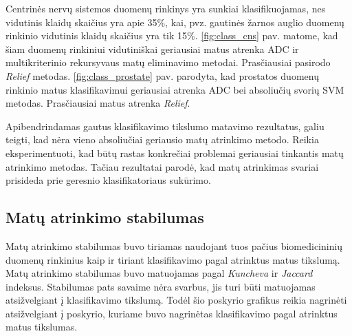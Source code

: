 Centrinės nervų sistemos duomenų rinkinys yra sunkiai klasifikuojamas, nes vidutinis klaidų skaičius yra apie 35\%, kai, pvz. gautinės žarnos auglio duomenų rinkinio vidutinis klaidų skaičius yra tik 15\%. \ref{fig:class_cns} pav. matome, kad šiam duomenų rinkiniui vidutiniškai geriausiai matus atrenka ADC ir multikriterinio rekursyvaus matų eliminavimo metodai. Prasčiausiai pasirodo \textit{Relief} metodas.
\ref{fig:class_prostate} pav. parodyta, kad prostatos duomenų rinkinio matus klasifikavimui geriausiai atrenka ADC bei absoliučių svorių SVM metodas. Prasčiausiai matus atrenka \textit{Relief}.

Apibendrindamas gautus klasifikavimo tikslumo matavimo rezultatus, galiu teigti, kad nėra vieno absoliučiai geriausio matų atrinkimo metodo. Reikia eksperimentuoti, kad būtų rastas konkrečiai problemai geriausiai tinkantis matų atrinkimo metodas. Tačiau rezultatai parodė, kad matų atrinkimas svariai prisideda prie geresnio klasifikatoriaus sukūrimo.

\subsection{Matų atrinkimo stabilumas}

Matų atrinkimo stabilumas buvo tiriamas naudojant tuos pačius biomedicininių duomenų rinkinius kaip ir tiriant klasifikavimo pagal atrinktus matus tikslumą. Matų atrinkimo stabilumas buvo matuojamas pagal \textit{Kuncheva} ir \textit{Jaccard} indeksus. Stabilumas pats savaime nėra svarbus, jis turi būti matuojamas atsižvelgiant į klasifikavimo tikslumą. Todėl šio poskyrio grafikus reikia nagrinėti atsižvelgiant į poskyrio, kuriame buvo nagrinėtas klasifikavimo pagal atrinktus matus tikslumas.

